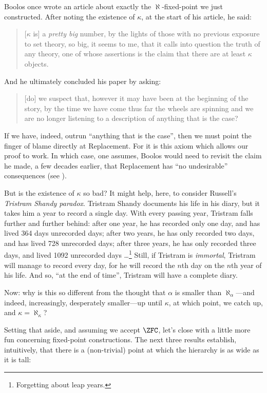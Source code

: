 \documentclass[../../../include/open-logic-section]{subfiles}
\begin{document}
Boolos once wrote an article about exactly the $\aleph$-fixed-point we
just constructed. After noting the existence of $\kappa$, at the start
of his article, he said:
\begin{quote}
	[$\kappa$ is] a \emph{pretty big} number, by the lights of those
	with no previous exposure to  set theory,  so big, it seems to me,
	that  it calls into question the truth of any theory, one of whose
	assertions is the claim that there are at least $\kappa$ objects.
	\cite[p.~257]{Boolos2000}
\end{quote}
And he ultimately concluded his paper by asking:
\begin{quote}
	[do] we  suspect that,  however  it  may  have  been  at  the
	beginning  of  the  story,  by  the  time  we have come thus  far
	the wheels  are  spinning  and  we  are no longer  listening  to
	a description  of  anything  that  is the case?
	\cite[p.~268]{Boolos2000}
\end{quote}
If we have, indeed, outrun ``anything that is the case'', then we must
point the finger of blame directly at Replacement. For it is this
axiom which allows our proof to work. In which case, one assumes,
Boolos would need to revisit the claim he made, a few decades earlier,
that Replacement has ``no undesirable'' consequences (see
).

But is the existence of $\kappa$ so bad? It might help, here, to
consider Russell's \emph{Tristram Shandy paradox}. Tristram Shandy
documents his life in his diary, but it takes him a year to record a
single day. With every passing year, Tristram falls further and
further behind: after one year, he has recorded only one day, and has
lived 364 days unrecorded days; after two years, he has only recorded
two days, and has lived 728 unrecorded days; after three years, he has
only recorded three days, and lived 1092 unrecorded
days \dots\footnote{Forgetting about leap years.} Still, if Tristram
is \emph{immortal}, Tristram will manage to record every day, for he
will record the $n$th day on the $n$th year of his life. And so, ``at
the end of time'', Tristram will have a complete diary. 

Now: why is this so different from the thought that $\alpha$ is
smaller than $\aleph_\alpha$---and indeed, increasingly, desperately
smaller---up until $\kappa$, at which point, we catch up, and $\kappa
= \aleph_\kappa$?

Setting that aside, and assuming we accept $\ZFC$, let's close with a
little more fun concerning fixed-point constructions. The next three
results establish, intuitively, that there is a (non-trivial) point at
which the hierarchy is as wide as it is tall:
\end{document}

